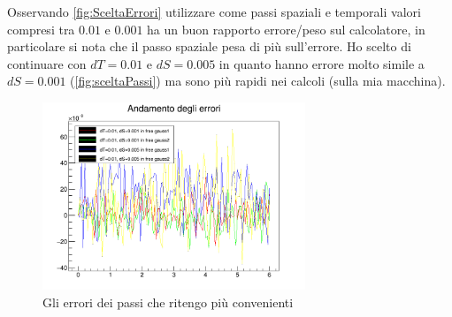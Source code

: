 Osservando \autoref{fig:SceltaErrori} utilizzare come passi spaziali e temporali valori compresi tra $0.01$ e $0.001$ ha un buon rapporto errore/peso sul calcolatore, in particolare si nota che il passo spaziale pesa di pi\`u sull'errore. Ho scelto di continuare con $dT = 0.01$ e $dS = 0.005$ in quanto hanno errore molto simile a $dS = 0.001$ (\autoref{fig:sceltaPassi}) ma sono pi\`u rapidi nei calcoli (sulla mia macchina).

\begin{figure}[htb]
\centering
\includegraphics[width=0.7\textwidth]{IMG/sceltaPassi}
\caption[Scelta Passi]{Gli errori dei passi che ritengo pi\`u convenienti}\label{fig:sceltaPassi}
\end{figure}

